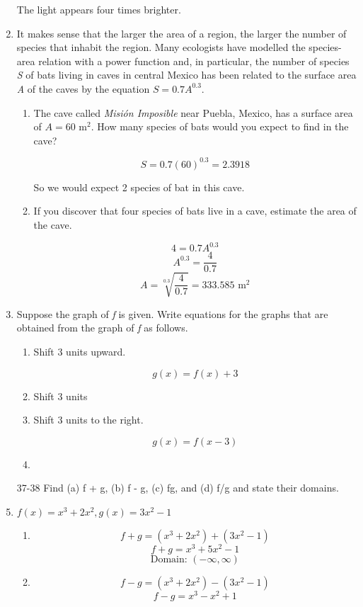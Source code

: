 \documentclass{article}
\begin{document}
\begin{enumerate}
			The light appears four times brighter.
			
		\item It makes sense that the larger the area of a region, the larger the number of species that inhabit the
			region. Many ecologists have modelled the species-area relation with a power function and, in particular,
			the number of species \emph{S} of bats living in caves in central Mexico has been related to the surface
			area \emph{A} of the caves by the equation $S = 0.7A^{0.3}$.

			\begin{enumerate}
				\item The cave called \emph{Misi\'{o}n Imposible} near Puebla, Mexico, has a surface area of
					$A = 60 \text{ m}^{2}$. How many species of bats would you expect to find in the cave?
					
					$$ S = 0.7(60)^{0.3} = 2.3918$$

					So we would expect 2 species of bat in this cave.

				\item If you discover that four species of bats live in a cave, estimate the area of the cave.

					$$4 = 0.7A^{0.3}$$
					$$A^{0.3} = \frac{4}{0.7}$$
					$$A = \sqrt[0.3]{\frac{4}{0.7}} = 333.585 \text{ m}^{2}$$
			\end{enumerate}

		\item Suppose the graph of \emph{f} is given. Write equations for the graphs that are obtained from the graph
			of \emph{f} as follows.

		\begin{enumerate}
			\item Shift 3 units upward.

				$$g(x) = f(x) + 3$$

			\item Shift 3 units 

			\item Shift 3 units to the right.

				$$g(x) = f(x - 3)$$

			\item 
		\end{enumerate}
			
		\item[37-38] Find (a) f + g, (b) f - g, (c) fg, and (d) f/g and state their domains.

		\item $f(x) = x^3 + 2x^2, g(x) = 3x^2 - 1$


		\begin{enumerate}
			\item 	$$f + g = (x^3 + 2x^2) + (3x^2 - 1)$$
			$$f + g = x^3 + 5x^2 - 1$$
			$$\text{Domain: } (-\infty, \infty)$$

			\item 

			$$f - g = (x^3 + 2x^2) - (3x^2 - 1)$$
			$$f - g = x^3 - x^2 + 1$$
		
		\end{enumerate}
			
	\end{enumerate}
\end{document}
